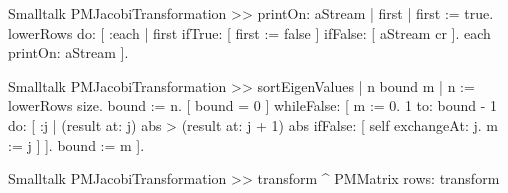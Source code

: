 \begin{displaycode}{Smalltalk}
PMJacobiTransformation >> printOn: aStream
    | first |
    first := true.
    lowerRows do: 
        [ :each |
          first ifTrue: [ first := false ]
                 ifFalse: [ aStream cr ].
          each printOn: aStream ].
\end{displaycode}

\begin{displaycode}{Smalltalk}
PMJacobiTransformation >> sortEigenValues
    | n bound m |
    n := lowerRows size.
    bound := n.
    [ bound = 0 ]
        whileFalse: [ m := 0.
                      1 to: bound - 1 do:
                        [ :j |
                          (result at: j) abs > (result at: j + 1) abs
                            ifFalse: [ self exchangeAt: j.
                                      m := j ] ].
                        bound := m ].
\end{displaycode}

\begin{displaycode}{Smalltalk}
PMJacobiTransformation >> transform
    ^ PMMatrix rows: transform
\end{displaycode}

